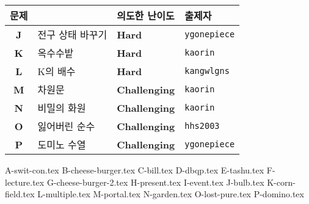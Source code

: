     \begin{frame}
        \begin{center}
            \begin{tabular}{cl|l|l}
                \hline
                문제 & & 의도한 난이도 & 출제자 \\
                \hline
                \hline
                \textbf{J} & 전구 상태 바꾸기 & \textbf{\color{acgold}Hard} & \texttt{ygonepiece} \\
                \textbf{K} & 옥수수밭 & \textbf{\color{acgold}Hard} & \texttt{kaorin} \\
                \textbf{L} & K의 배수 & \textbf{\color{acgold}Hard} & \texttt{kangwlgns} \\
                \textbf{M} & 차원문 & \textbf{\color{acgold}Challenging} & \texttt{kaorin} \\
                \textbf{N} & 비밀의 화원 & \textbf{\color{acplatinum}Challenging} & \texttt{kaorin} \\
                \textbf{O} & 잃어버린 순수 & \textbf{\color{acplatinum}Challenging} & \texttt{hhs2003} \\
                \textbf{P} & 도미노 수열 & \textbf{\color{acdiamond}Challenging} & \texttt{ygonepiece} \\
                \hline
            \end{tabular}
        \end{center}
    \end{frame}
    
    {A-swit-con.tex}
    {B-cheese-burger.tex}
    {C-bill.tex}
    {D-dbqp.tex}
    {E-tashu.tex}
    {F-lecture.tex}
    {G-cheese-burger-2.tex}
    {H-present.tex}
    {I-event.tex}
    {J-bulb.tex}
    {K-corn-field.tex}
    {L-multiple.tex}
    {M-portal.tex}
    {N-garden.tex}
    {O-lost-pure.tex}
    {P-domino.tex}
